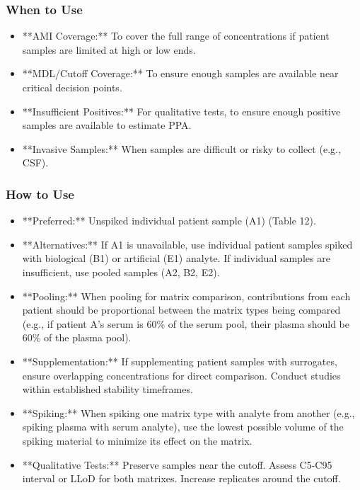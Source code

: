 \documentclass{article}
\begin{document}
\subsubsection{When to Use}
\begin{itemize}
    \item **AMI Coverage:** To cover the full range of concentrations if patient samples are limited at high or low ends.
    \item **MDL/Cutoff Coverage:** To ensure enough samples are available near critical decision points.
    \item **Insufficient Positives:** For qualitative tests, to ensure enough positive samples are available to estimate PPA.
    \item **Invasive Samples:** When samples are difficult or risky to collect (e.g., CSF).
\end{itemize}

\subsubsection{How to Use}
\begin{itemize}
    \item **Preferred:** Unspiked individual patient sample (A1) (Table 12).
    \item **Alternatives:** If A1 is unavailable, use individual patient samples spiked with biological (B1) or artificial (E1) analyte. If individual samples are insufficient, use pooled samples (A2, B2, E2).
    \item **Pooling:** When pooling for matrix comparison, contributions from each patient should be proportional between the matrix types being compared (e.g., if patient A's serum is 60\% of the serum pool, their plasma should be 60\% of the plasma pool).
    \item **Supplementation:** If supplementing patient samples with surrogates, ensure overlapping concentrations for direct comparison. Conduct studies within established stability timeframes.
    \item **Spiking:** When spiking one matrix type with analyte from another (e.g., spiking plasma with serum analyte), use the lowest possible volume of the spiking material to minimize its effect on the matrix.
    \item **Qualitative Tests:** Preserve samples near the cutoff. Assess C5-C95 interval or LLoD for both matrixes. Increase replicates around the cutoff.
\end{itemize}
\end{document}
